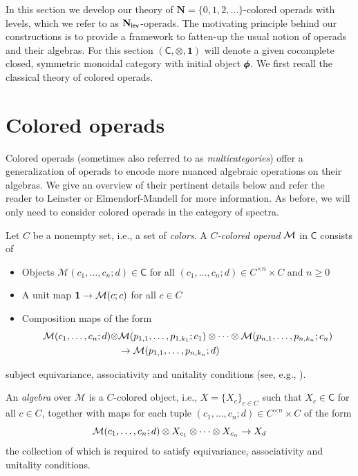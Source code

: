 \label{sec:N-lev}
In this section we develop our theory of $\mathbf{N}=\{0,1,2,\dots\}$-colored operads with levels, which we refer to as $\mathbf{N}_{\mathsf{lev}}$-operads. The motivating principle behind our constructions is to provide a framework to fatten-up the usual notion of operads and their algebras. For this section $(\mathsf{C},\otimes, \mathbf{1})$ will denote a given cocomplete closed, symmetric monoidal category with initial object $\pmb{\phi}$. We first recall the classical theory of colored operads. 

\section{Colored operads}

Colored operads (sometimes also referred to as \textit{multicategories}) offer a generalization of operads to encode more nuanced algebraic operations on their algebras. We give an overview of their pertinent details below and refer the reader to Leinster \cite{Lei} or Elmendorf-Mandell \cite{EM-colop} for more information. As before, we will only need to consider colored operads in the category of spectra. 

\begin{definition} Let $C$ be a nonempty set, i.e., a set of \textit{colors}. A \textit{$C$-colored operad} $\mathcal{M}$ in $\mathsf{C}$ consists of \begin{itemize}
    \item Objects $\mathcal{M}(c_1,\dots,c_n;d)\in \mathsf{C}$ for all $(c_1,\dots,c_n;d)\in C^{\times n}\times C$ and $n\geq 0$
    \item A unit map $\mathbf{1} \to \mathcal{M}(c;c)$ for all $c\in C$
    \item Composition maps of the form \begin{align} \label{eq:colored-op-comp}
   \mathcal{M}(c_1,\dots,c_n;d)\otimes& \mathcal{M}(p_{1,1}, \dots, p_{1,k_1};c_1)\otimes \cdots \otimes \mathcal{M}(p_{n,1},\dots,p_{n,k_n};c_n) \\
    &\to \mathcal{M}(p_{1,1},\dots, p_{n,k_n};d) \nonumber
\end{align}
\end{itemize} 
subject equivariance, associativity and unitality conditions (see, e.g.,  \cite[2.1]{EM-colop}).
\end{definition} 

An \textit{algebra} over $\mathcal{M}$ is a $C$-colored object, i.e., $X=\{X_c\}_{c\in C}$ such that $X_c\in \mathsf{C}$ for all $c\in C$, together with maps for each tuple $(c_1,\dots,c_n;d)\in C^{\times n}\times C$ of the form \[\mathcal{M}(c_1,\dots,c_n;d)\otimes X_{c_1}\otimes \cdots \otimes X_{c_n} \to X_d\] the collection of which is required to satisfy equivariance, associativity and unitality conditions. 

